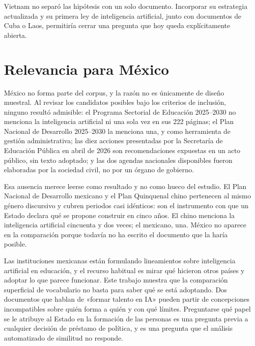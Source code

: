Vietnam no separó las hipótesis con un solo documento. Incorporar su estrategia actualizada y su primera ley de inteligencia artificial, junto con documentos de Cuba o Laos, permitiría cerrar una pregunta que hoy queda explícitamente abierta.

\section{Relevancia para México}

México no forma parte del corpus, y la razón no es únicamente de diseño muestral. Al revisar los candidatos posibles bajo los criterios de inclusión, ninguno resultó admisible: el Programa Sectorial de Educación 2025--2030 no menciona la inteligencia artificial ni una sola vez en sus 222 páginas; el Plan Nacional de Desarrollo 2025--2030 la menciona una, y como herramienta de gestión administrativa; las diez acciones presentadas por la Secretaría de Educación Pública en abril de 2026 son recomendaciones expuestas en un acto público, sin texto adoptado; y las dos agendas nacionales disponibles fueron elaboradas por la sociedad civil, no por un órgano de gobierno.

Esa ausencia merece leerse como resultado y no como hueco del estudio. El Plan Nacional de Desarrollo mexicano y el Plan Quinquenal chino pertenecen al mismo género discursivo y cubren periodos casi idénticos: son el instrumento con que un Estado declara qué se propone construir en cinco años. El chino menciona la inteligencia artificial cincuenta y dos veces; el mexicano, una. México no aparece en la comparación porque todavía no ha escrito el documento que la haría posible.

Las instituciones mexicanas están formulando lineamientos sobre inteligencia artificial en educación, y el recurso habitual es mirar qué hicieron otros países y adoptar lo que parece funcionar. Este trabajo muestra que la comparación superficial de vocabulario no basta para saber qué se está adoptando. Dos documentos que hablan de «formar talento en IA» pueden partir de concepciones incompatibles sobre quién forma a quién y con qué límites. Preguntarse qué papel se le atribuye al Estado en la formación de las personas es una pregunta previa a cualquier decisión de préstamo de política, y es una pregunta que el análisis automatizado de similitud no responde.
